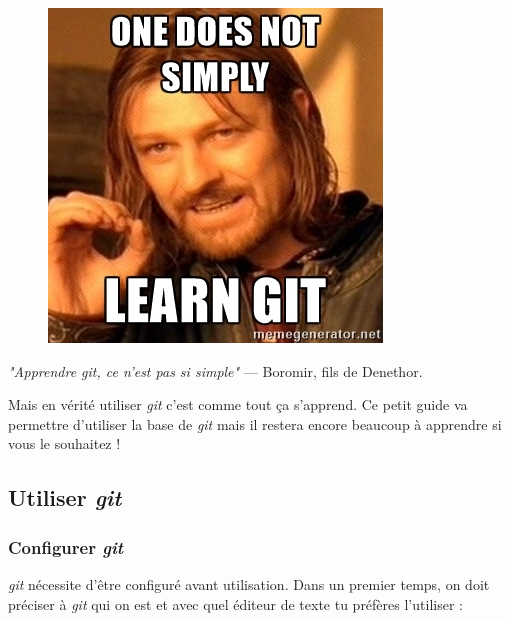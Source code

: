 \documentclass[12pt,a4paper]{article}
\begin{document}
\begin{figure}
\vspace*{-1.2\baselineskip}
\centering
\includegraphics[width=\linewidth]{git_not_simple}
\end{figure}
\emph{"Apprendre git, ce n'est pas si simple"} --- Boromir, fils de Denethor.

Mais en vérité utiliser \emph{git} c'est comme tout ça s'apprend. Ce petit guide va permettre d'utiliser la base de \emph{git} mais il restera encore beaucoup à apprendre si vous le souhaitez !

\subsection{Utiliser \emph{git}}

\subsubsection{Configurer \emph{git}}

\emph{git} nécessite d'être configuré avant utilisation. Dans un premier temps, on doit préciser à \emph{git} qui on est et avec quel éditeur de texte tu préfères l'utiliser :
\end{document}
